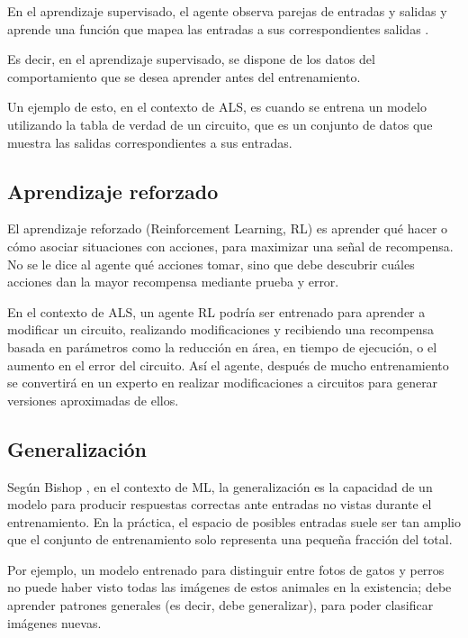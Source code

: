 En el aprendizaje supervisado, el agente observa parejas de entradas y salidas
y aprende una función que mapea las entradas a sus correspondientes salidas
\cite{russell2016artificial}.

Es decir, en el aprendizaje supervisado, se dispone de los datos del
comportamiento que se desea aprender antes del entrenamiento.

Un ejemplo de esto, en el contexto de ALS, es cuando se entrena un modelo
utilizando la tabla de verdad de un circuito, que es un conjunto de datos que
muestra las salidas correspondientes a sus entradas.

\subsection{Aprendizaje reforzado}

El aprendizaje reforzado (Reinforcement Learning, RL) es aprender qué hacer o
cómo asociar situaciones con acciones, para maximizar una señal de recompensa.
No se le dice al agente qué acciones tomar, sino que debe descubrir cuáles
acciones dan la mayor recompensa mediante prueba y error.
\cite{sutton_reinforcement_2018}

En el contexto de ALS, un agente RL podría ser entrenado para aprender a
modificar un circuito, realizando modificaciones y recibiendo una recompensa
basada en parámetros como la reducción en área, en tiempo de ejecución, o el
aumento en el error del circuito. Así el agente, después de mucho entrenamiento
se convertirá en un experto en realizar modificaciones a circuitos para generar
versiones aproximadas de ellos.

\subsection{Generalización}

Según Bishop \cite{bishop_pattern_2006}, en el contexto de ML, la
generalización es la capacidad de un modelo para producir respuestas correctas
ante entradas no vistas durante el entrenamiento. En la práctica, el espacio de
posibles entradas suele ser tan amplio que el conjunto de entrenamiento solo
representa una pequeña fracción del total.

Por ejemplo, un modelo entrenado para distinguir entre fotos de gatos y perros
no puede haber visto todas las imágenes de estos animales en la existencia;
debe aprender patrones generales (es decir, debe generalizar), para poder
clasificar imágenes nuevas.

